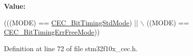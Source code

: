 {\bfseries Value\+:}
\begin{DoxyCode}
(((MODE) == \hyperlink{group___c_e_c___bit_timing___mode_gaf6866e5087bb01c1ea4e20a207a1f691}{CEC\_BitTimingStdMode}) || \(\backslash\)
                                            ((MODE) == \hyperlink{group___c_e_c___bit_timing___mode_ga4fd44675c774985d1f6cd8976b18c947}{CEC\_BitTimingErrFreeMode}))
\end{DoxyCode}


Definition at line 72 of file stm32f10x\+\_\+cec.\+h.

